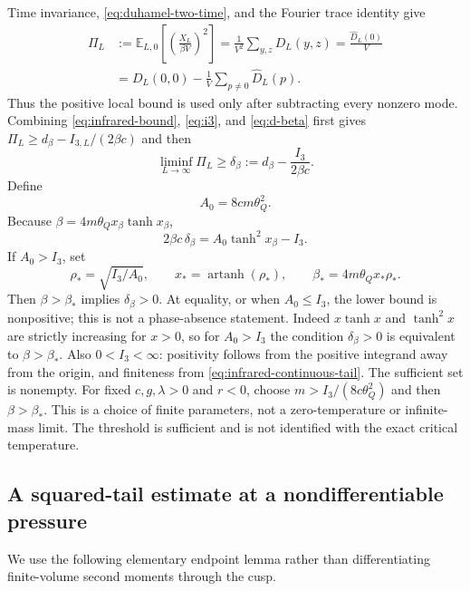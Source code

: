 \documentclass[11pt]{article}
\numberwithin{equation}{section}
\theoremstyle{definition}
\newcommand{\E}{\mathbb E}
\begin{document}
Time invariance, \eqref{eq:duhamel-two-time}, and the Fourier trace identity
give
\begin{align}
 \Pi_L&:=\E_{L,0}\left[\left(\frac{X_L}{\beta V}\right)^2\right]
 =\frac1{V^2}\sum_{y,z}D_L(y,z)
 =\frac{\widehat D_L(0)}V\nonumber\\
 &=D_L(0,0)-\frac1V\sum_{p\neq0}\widehat D_L(p). \label{eq:zero-mode}
\end{align}
Thus the positive local bound is used only after subtracting every
nonzero mode.  Combining \eqref{eq:infrared-bound}, \eqref{eq:i3}, and
\eqref{eq:d-beta} first gives
$\Pi_L\geq d_\beta-I_{3,L}/(2\beta c)$ and then
\begin{equation}
 \liminf_{L\to\infty}\Pi_L\geq
 \delta_\beta:=d_\beta-\frac{I_3}{2\beta c}. \label{eq:delta}
\end{equation}
Define
\begin{equation}
 A_0=8cm\theta_Q^2. \label{eq:a0}
\end{equation}
Because $\beta=4m\theta_Qx_\beta\tanh x_\beta$,
\begin{equation}
 2\beta c\,\delta_\beta=A_0\tanh^2x_\beta-I_3. \label{eq:threshold-algebra}
\end{equation}
If $A_0>I_3$, set
\begin{equation}
 \rho_*=\sqrt{I_3/A_0},\qquad x_*=\operatorname{artanh}(\rho_*),\qquad
 \beta_*=4m\theta_Qx_*\rho_*. \label{eq:beta-star}
\end{equation}
Then $\beta>\beta_*$ implies $\delta_\beta>0$.  At equality, or when
$A_0\leq I_3$, the lower bound is nonpositive; this is not a phase-absence
statement.
Indeed $x\tanh x$ and $\tanh^2x$ are strictly increasing for $x>0$,
so for $A_0>I_3$ the condition $\delta_\beta>0$ is equivalent to
$\beta>\beta_*$.  Also $0<I_3<\infty$: positivity follows from the
positive integrand away from the origin, and finiteness from
\eqref{eq:infrared-continuous-tail}.  The sufficient set is nonempty.
For fixed $c,g,\lambda>0$ and $r<0$, choose
$m>I_3/(8c\theta_Q^2)$ and then $\beta>\beta_*$.
This is a choice of finite parameters, not a zero-temperature or infinite-mass
limit.  The threshold is sufficient and is not identified with the exact
critical temperature.

\subsection{A squared-tail estimate at a nondifferentiable pressure}

We use the following elementary endpoint lemma rather than differentiating
finite-volume second moments through the cusp.
\end{document}

